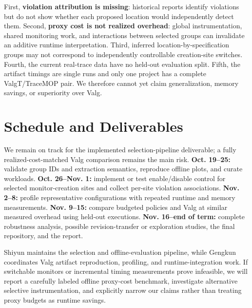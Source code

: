 \documentclass[10pt,letterpaper]{article}
\begin{document}
First, \textbf{violation attribution is missing}: historical reports identify
violations but do not show whether each proposed location would independently
detect them. Second, \textbf{proxy cost is not realized overhead}: global
instrumentation, shared monitoring work, and interactions between selected
groups can invalidate an additive runtime interpretation. Third, inferred
location-by-specification groups may not correspond to independently controllable
creation-site switches. Fourth, the current real-trace data have no held-out
evaluation split. Fifth, the artifact timings are single runs and only one
project has a complete ValgT/TraceMOP pair. We therefore cannot yet claim
generalization, memory savings, or superiority over Valg.

\section{Schedule and Deliverables}

We remain on track for the implemented selection-pipeline deliverable; a fully
realized-cost-matched Valg comparison remains the main risk. \textbf{Oct.
19--25:} validate group IDs and extraction semantics, reproduce offline plots,
and curate workloads. \textbf{Oct. 26--Nov. 1:} implement or test enable/disable
control for selected monitor-creation sites and collect per-site violation
associations. \textbf{Nov. 2--8:} profile representative configurations with
repeated runtime and memory measurements. \textbf{Nov. 9--15:} compare budgeted
policies and Valg at similar measured overhead using held-out executions.
\textbf{Nov. 16--end of term:} complete robustness analysis, possible
revision-transfer or exploration studies, the final repository, and the report.

Shiyun maintains the selection and offline-evaluation pipeline, while Gengkun
coordinates Valg artifact reproduction, profiling, and runtime-integration work.
If switchable monitors or incremental timing measurements prove infeasible, we
will report a carefully labeled offline proxy-cost benchmark, investigate
alternative selective instrumentation, and explicitly narrow our claims rather
than treating proxy budgets as runtime savings.
\end{document}
